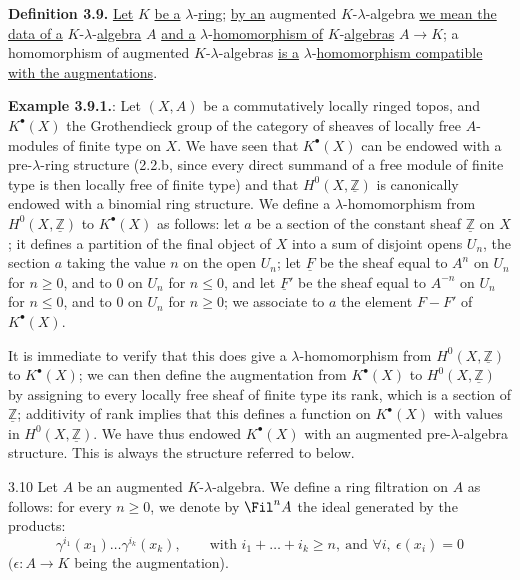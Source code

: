 %
\textbf{Definition 3.9.} \uline{Let} \(K\) \uline{be a} \(\lambda\)-\uline{ring}; \uline{by an} augmented \(K\)-\(\lambda\)-algebra \uline{we mean the data of a} \(K\)-\(\lambda\)-\uline{algebra} \(A\) \uline{and a} \(\lambda\)-\uline{homomorphism of} \(K\)-\uline{algebras} \(A\to K\); a homomorphism of augmented \(K\)-\(\lambda\)-algebras \uline{is a} \(\lambda\)-\uline{homomorphism compatible with the augmentations}.

\textbf{Example 3.9.1.}: Let \((X,A)\) be a commutatively locally ringed topos, and \(K^\bullet(X)\) the Grothendieck group of the category of sheaves of locally free \(A\)-modules of finite type on \(X\). We have seen that \(K^\bullet(X)\) can be endowed with a pre-\(\lambda\)-ring structure (2.2.b, since every direct summand of a free module of finite type is then locally free of finite type) and that \(H^0(X,\underline{\mathbb Z})\) is canonically endowed with a binomial ring structure. We define a \(\lambda\)-homomorphism from \(H^0(X,\underline{\mathbb Z})\) to \(K^\bullet(X)\) as follows: let \(a\) be a section of the constant sheaf \(\underline{\mathbb Z}\) on \(X\); it defines a partition of the final object of \(X\) into a sum of disjoint opens \(U_n\), the section \(a\) taking the value \(n\) on the open \(U_n\); let \(\underline{F}\) be the sheaf equal to \(A^n\) on \(U_n\) for \(n\ge0\), and to \(0\) on \(U_n\) for \(n\le0\), and let \(\underline{F}'\) be the sheaf equal to \(A^{-n}\) on \(U_n\) for \(n\le0\), and to \(0\) on \(U_n\) for \(n\ge0\); we associate to \(a\) the element \(F-F'\) of \(K^\bullet(X)\).

It is immediate to verify that this does give a \(\lambda\)-homomorphism from \(H^0(X,\underline{\mathbb Z})\) to \(K^\bullet(X)\); we can then define the augmentation from \(K^\bullet(X)\) to \(H^0(X,\underline{\mathbb Z})\) by assigning to every locally free sheaf of finite type its rank, which is a section of \(\underline{\mathbb Z}\); additivity of rank implies that this defines a function on \(K^\bullet(X)\) with values in \(H^0(X,\underline{\mathbb Z})\). We have thus endowed \(K^\bullet(X)\) with an augmented pre-\(\lambda\)-algebra structure. This is always the structure referred to below.

%
3.10
Let \(A\) be an augmented \(K\)-\(\lambda\)-algebra. We define a ring filtration on \(A\) as follows: for every \(n\ge0\), we denote by \(\Fil^n A\) the ideal generated by the products:
\begin{equation}\tag{3.10.1}
  \gamma^{i_1}(x_1)\ldots\gamma^{i_k}(x_k),
  \qquad \text{with } i_1+\ldots+i_k\ge n,\ \text{and } \forall i,\ \epsilon(x_i)=0
\end{equation}
\((\epsilon:A\to K\) being the augmentation).

